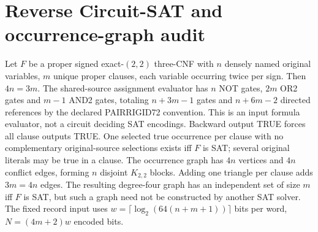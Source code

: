 \documentclass[11pt]{article}
\begin{document}
\section{Reverse Circuit-SAT and occurrence-graph audit}
Let $F$ be a proper signed exact-$(2,2)$ three-CNF with $n$ densely named original variables, $m$ unique proper clauses, each variable occurring twice per sign. Then $4n=3m$. The shared-source assignment evaluator has $n$ NOT gates, $2m$ OR2 gates and $m-1$ AND2 gates, totaling $n+3m-1$ gates and $n+6m-2$ directed references by the declared PAIRRIGID72 convention. This is an input formula evaluator, not a circuit deciding SAT encodings.
Backward output TRUE forces all clause outputs TRUE. One selected true occurrence per clause with no complementary original-source selections exists iff $F$ is SAT; several original literals may be true in a clause. The occurrence graph has $4n$ vertices and $4n$ conflict edges, forming $n$ disjoint $K_{2,2}$ blocks. Adding one triangle per clause adds $3m=4n$ edges. The resulting degree-four graph has an independent set of size $m$ iff $F$ is SAT, but such a graph need not be constructed by another SAT solver.
The fixed record input uses $w=\lceil\log_2(64(n+m+1))\rceil$ bits per word, $N=(4m+2)w$ encoded bits.
\end{document}
